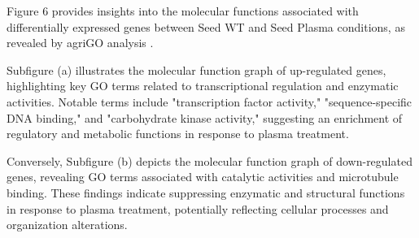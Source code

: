 \documentclass[12pt,letterpaper]{article}
\begin{document}
Figure 6 provides insights into the molecular functions associated with differentially expressed genes between Seed WT and Seed Plasma conditions, as revealed by agriGO analysis \parencite{tian2017agrigo}.

Subfigure (a) illustrates the molecular function graph of up-regulated genes, highlighting key GO terms related to transcriptional regulation and enzymatic activities. Notable terms include "transcription factor activity," "sequence-specific DNA binding," and "carbohydrate kinase activity," suggesting an enrichment of regulatory and metabolic functions in response to plasma treatment.

Conversely, Subfigure (b) depicts the molecular function graph of down-regulated genes, revealing GO terms associated with catalytic activities and microtubule binding. These findings indicate suppressing enzymatic and structural functions in response to plasma treatment, potentially reflecting cellular processes and organization alterations.
\end{document}
